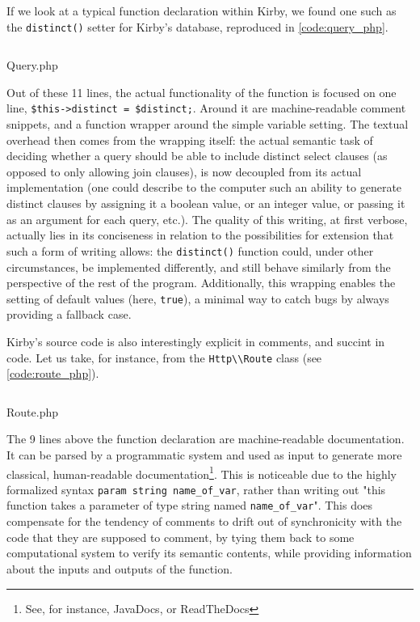 If we look at a typical function declaration within Kirby, we found one such as the \lstinline{distinct()} setter for Kirby's database, reproduced in \ref{code:query_php}.

\begin{listing}
  \inputminted{php}{./corpus/query.php}
  \caption{Query.php}
  \label{code:query_php}
\end{listing}

Out of these 11 lines, the actual functionality of the function is focused on one line, \lstinline{$this->distinct = $distinct;}. Around it are machine-readable comment snippets, and a function wrapper around the simple variable setting. The textual overhead then comes from the wrapping itself: the actual semantic task of deciding whether a query should be able to include distinct select clauses (as opposed to only allowing join clauses), is now decoupled from its actual implementation (one could describe to the computer such an ability to generate distinct clauses by assigning it a boolean value, or an integer value, or passing it as an argument for each query, etc.). The quality of this writing, at first verbose, actually lies in its conciseness in relation to the possibilities for extension that such a form of writing allows: the \lstinline{distinct()} function could, under other circumstances, be implemented differently, and still behave similarly from the perspective of the rest of the program. Additionally, this wrapping enables the setting of default values (here, \lstinline{true}), a minimal way to catch bugs by always providing a fallback case.

Kirby's source code is also interestingly explicit in comments, and succint in code. Let us take, for instance, from the \lstinline{Http\\Route} class (see \ref{code:route_php}).

\begin{listing}
  \inputminted{php}{./corpus/route.php}
  \caption{Route.php}
  \label{code:route_php}
\end{listing}

The 9 lines above the function declaration are machine-readable documentation. It can be parsed by a programmatic system and used as input to generate more classical, human-readable documentation\footnote{See, for instance, JavaDocs, or ReadTheDocs}. This is noticeable due to the highly formalized syntax \lstinline{param string name_of_var}, rather than writing out "this function takes a parameter of type string named \lstinline{name_of_var}". This does compensate for the tendency of comments to drift out of synchronicity with the code that they are supposed to comment, by tying them back to some computational system to verify its semantic contents, while providing information about the inputs and outputs of the function.

